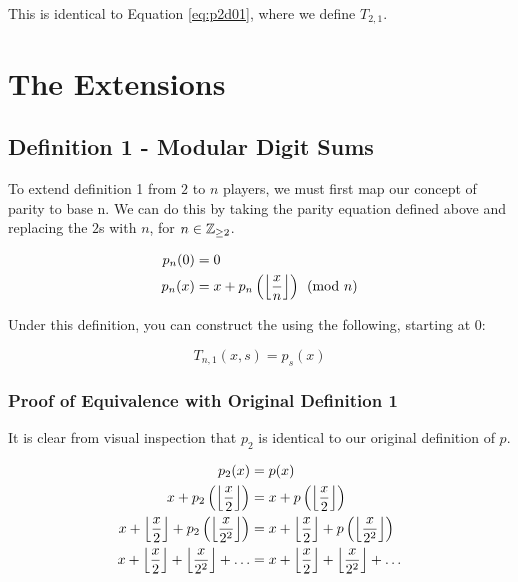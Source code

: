 \documentclass[conference]{IEEEtran}
\begin{document}
This is identical to Equation \ref{eq:p2d01}, where we define $T_{2,1}$.

\section{The Extensions}

\subsection{Definition 1 - Modular Digit Sums}


To extend definition 1 from $2$ to $n$ players, we must first map our concept of parity to base n. We can do this by taking the parity equation defined above and replacing the $2$s with $n$, for $n \in \mathbb{Z}_{\ge 2}$.

\begin{equation}
    \begin{aligned}
p_n(0) &= 0 \\
p_n(x) &= x + p_n\left(\left\lfloor \dfrac{x}{n} \right\rfloor\right) \pmod{n}
    \end{aligned}
\end{equation}

Under this definition, you can construct the \TMS using the following, starting at 0:

\begin{equation}
    \label{eq:pnd01}
    T_{n,1}(x, s) = p_s(x)
\end{equation}

\subsubsection{Proof of Equivalence with Original Definition 1}

It is clear from visual inspection that $p_2$ is identical to our original definition of $p$.

\begin{equation}
    \begin{aligned}
                                                           p_2(x) &= p(x) \\
                         x + p_2\left(\left\lfloor \dfrac{x}{2} \right\rfloor\right) &= x + p\left(\left\lfloor \dfrac{x}{2} \right\rfloor\right) \\
x + \left\lfloor \dfrac{x}{2} \right\rfloor + p_2\left(\left\lfloor \dfrac{x}{2^2} \right\rfloor\right) &= x + \left\lfloor \dfrac{x}{2} \right\rfloor + p\left(\left\lfloor \dfrac{x}{2^2} \right\rfloor\right) \\
       x + \left\lfloor \dfrac{x}{2} \right\rfloor + \left\lfloor \dfrac{x}{2^2} \right\rfloor + \ldots &= x + \left\lfloor \dfrac{x}{2} \right\rfloor + \left\lfloor \dfrac{x}{2^2} \right\rfloor + \ldots
    \end{aligned}
\end{equation}
\end{document}
